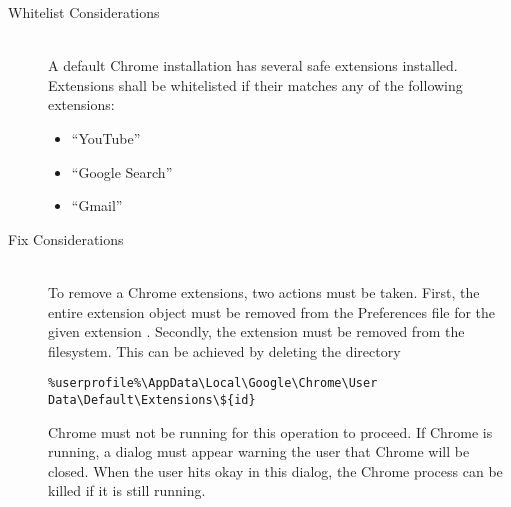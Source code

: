 \begin{description}
\item[Whitelist Considerations] \hfill \\
A default Chrome installation has several safe extensions installed.  Extensions
shall be whitelisted if their  matches any of the following
extensions:
\begin{itemize}
\item ``YouTube''
\item ``Google Search''
\item ``Gmail''
\end{itemize}
\item[Fix Considerations] \hfill \\
To remove a Chrome extensions, two actions must be taken.  First, the entire
extension object must be removed from the Preferences file for the given
extension .  Secondly, the extension must be removed from the
filesystem.  This can be achieved by deleting the directory 
\vspace{-\baselineskip}
\begin{verbatim}
%userprofile%\AppData\Local\Google\Chrome\User Data\Default\Extensions\${id}
\end{verbatim}

Chrome must not be running for this operation to proceed.  If Chrome is running,
a dialog must appear warning the user that Chrome will be closed.  When the
user hits okay in this dialog, the Chrome process can be killed if it is still
running.  
\end{description}

